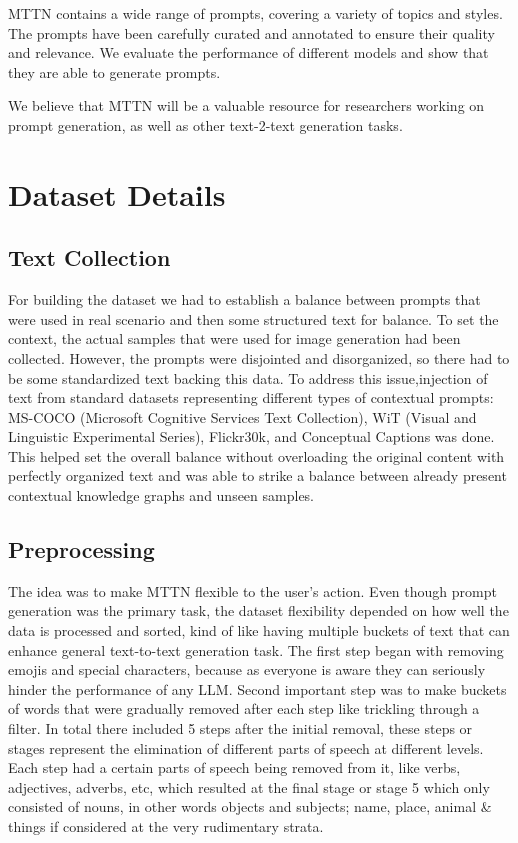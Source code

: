 \documentclass{article}
\begin{document}
MTTN contains a wide range of prompts, covering a variety of topics and styles. The prompts have been carefully curated and annotated to ensure their quality and relevance. We evaluate the performance of different models and show that they are able to generate prompts.

We believe that MTTN will be a valuable resource for researchers working on prompt generation, as well as other text-2-text generation tasks.


\section{Dataset Details}
\subsection{Text Collection}
For building the dataset we had to establish a balance between prompts that were used in real scenario and then some structured text for balance. To set the context, the actual samples that were used for image generation had been collected. However, the prompts were disjointed and disorganized, so there had to be some standardized text backing this data. To address this issue,injection of text from standard datasets representing different types of contextual prompts: MS-COCO\cite{DBLP:journals/corr/LinMBHPRDZ14} (Microsoft Cognitive Services Text Collection), WiT\cite{srinivasan2021wit} (Visual and Linguistic Experimental Series), Flickr30k\cite{DBLP:journals/corr/PlummerWCCHL15}, and Conceptual Captions\cite{sharma2018conceptual} was done. This helped  set the overall balance without overloading the original content with perfectly organized text and was able to strike a balance between already present contextual knowledge graphs and unseen samples.

\subsection{Preprocessing}
The idea was to make MTTN flexible to the user's action. Even though prompt generation was the primary task, the dataset flexibility depended on how well the data is processed and sorted, kind of like having multiple buckets of text that can enhance general text-to-text generation task. 
The first step began with removing emojis and special characters, because as everyone is aware they can seriously hinder the performance of any LLM. Second important step was to make buckets of words that were gradually removed after each step like trickling through a filter. In total there included 5 steps after the initial removal, these steps or stages represent the elimination of different parts of speech at different levels. Each step had a certain parts of speech being removed from it, like verbs, adjectives, adverbs, etc, which resulted at the final stage or stage 5 which only consisted of nouns, in other words objects and subjects; name, place, animal \& things if considered at the very rudimentary strata.
\end{document}
